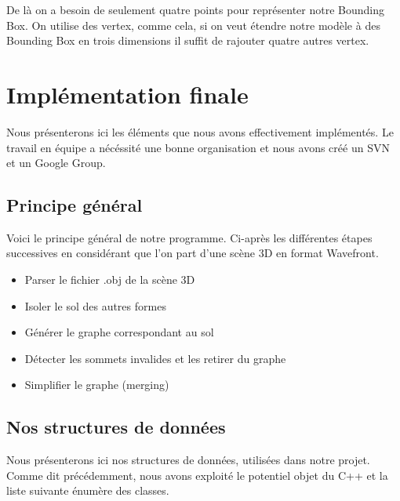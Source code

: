 \documentclass[a4paper,12pt]{report}
\begin{document}
De là on a besoin de seulement quatre points pour représenter notre Bounding Box. On utilise des vertex, comme cela, si on veut étendre notre modèle à des Bounding Box en trois dimensions il suffit de rajouter quatre autres vertex.

\chapter{Implémentation finale}

Nous présenterons ici les éléments que nous avons effectivement implémentés. Le travail en équipe a nécéssité une bonne organisation et nous avons créé un SVN et un Google Group.

\section{Principe général}

Voici le principe général de notre programme. Ci-après les différentes étapes successives en considérant que l'on part d'une scène 3D en format Wavefront.

\begin{itemize}
 \item Parser le fichier .obj de la scène 3D
 \item Isoler le sol des autres formes
 \item Générer le graphe correspondant au sol
 \item Détecter les sommets invalides et les retirer du graphe
 \item Simplifier le graphe (merging)
\end{itemize}

\section{Nos structures de données}

Nous présenterons ici nos structures de données, utilisées dans notre projet. Comme dit précédemment, nous avons exploité le potentiel objet du C++ et la liste suivante énumère des classes.
\end{document}
